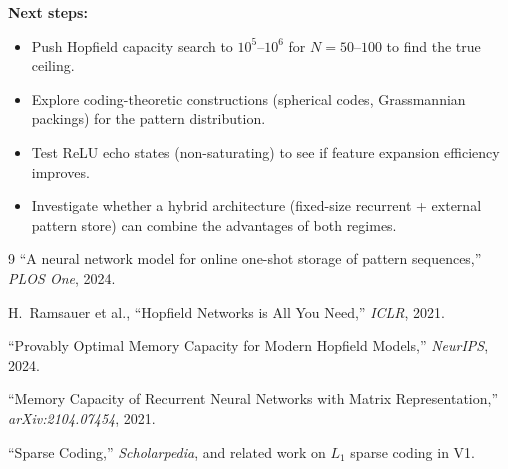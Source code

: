 \documentclass[11pt]{article}
\theoremstyle{definition}
\theoremstyle{remark}
\begin{document}
\textbf{Next steps:}
\begin{itemize}
    \item Push Hopfield capacity search to $10^5$--$10^6$ for $N = 50$--$100$ to find the true ceiling.
    \item Explore coding-theoretic constructions (spherical codes, Grassmannian packings) for the pattern distribution.
    \item Test ReLU echo states (non-saturating) to see if feature expansion efficiency improves.
    \item Investigate whether a hybrid architecture (fixed-size recurrent + external pattern store) can combine the advantages of both regimes.
\end{itemize}

\begin{thebibliography}{9}
``A neural network model for online one-shot storage of pattern sequences,'' \emph{PLOS One}, 2024.

H.~Ramsauer et al., ``Hopfield Networks is All You Need,'' \emph{ICLR}, 2021.

``Provably Optimal Memory Capacity for Modern Hopfield Models,'' \emph{NeurIPS}, 2024.

``Memory Capacity of Recurrent Neural Networks with Matrix Representation,'' \emph{arXiv:2104.07454}, 2021.

``Sparse Coding,'' \emph{Scholarpedia}, and related work on $L_1$ sparse coding in V1.
\end{thebibliography}
\end{document}
